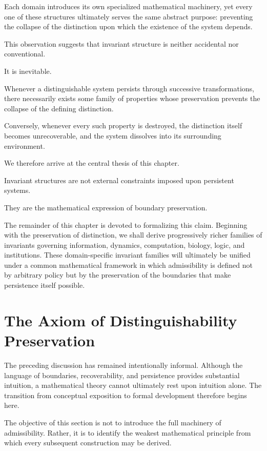 \documentclass[11pt]{book}
\numberwithin{equation}{chapter}
\theoremstyle{definition}
\theoremstyle{plain}
\begin{document}
Each domain introduces its own specialized mathematical machinery, yet every one of these structures ultimately serves the same abstract purpose: preventing the collapse of the distinction upon which the existence of the system depends.

This observation suggests that invariant structure is neither accidental nor conventional.

It is inevitable.

Whenever a distinguishable system persists through successive transformations, there necessarily exists some family of properties whose preservation prevents the collapse of the defining distinction.

Conversely, whenever every such property is destroyed, the distinction itself becomes unrecoverable, and the system dissolves into its surrounding environment.

We therefore arrive at the central thesis of this chapter.

Invariant structures are not external constraints imposed upon persistent systems.

They are the mathematical expression of boundary preservation.

The remainder of this chapter is devoted to formalizing this claim. Beginning with the preservation of distinction, we shall derive progressively richer families of invariants governing information, dynamics, computation, biology, logic, and institutions. These domain-specific invariant families will ultimately be unified under a common mathematical framework in which admissibility is defined not by arbitrary policy but by the preservation of the boundaries that make persistence itself possible.

\section{The Axiom of Distinguishability Preservation}

The preceding discussion has remained intentionally informal. Although the language of boundaries, recoverability, and persistence provides substantial intuition, a mathematical theory cannot ultimately rest upon intuition alone. The transition from conceptual exposition to formal development therefore begins here.

The objective of this section is not to introduce the full machinery of admissibility. Rather, it is to identify the weakest mathematical principle from which every subsequent construction may be derived.
\end{document}

